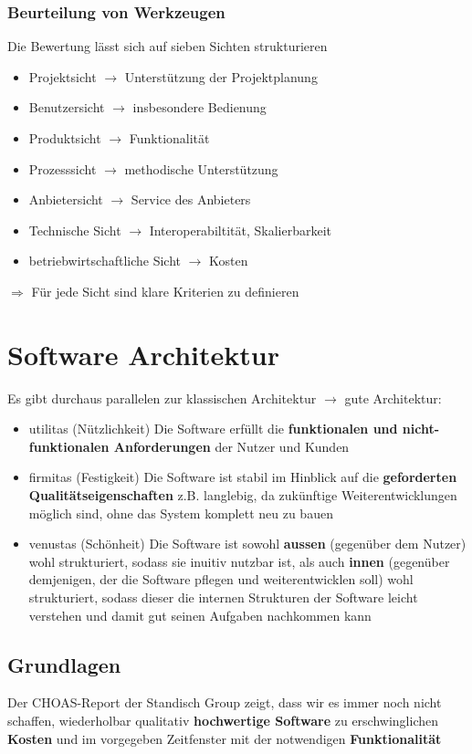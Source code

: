 \documentclass{report}
\theoremstyle{definition}
\theoremstyle{example}
\begin{document}
\subsection{Beurteilung von Werkzeugen}
Die Bewertung lässt sich auf sieben Sichten strukturieren
\begin{itemize}
   \item Projektsicht $\rightarrow$ Unterstützung der Projektplanung
   \item Benutzersicht $\rightarrow$ insbesondere Bedienung
   \item Produktsicht $\rightarrow$ Funktionalität
   \item Prozesssicht $\rightarrow$ methodische Unterstützung
   \item Anbietersicht $\rightarrow$ Service des Anbieters
   \item Technische Sicht $\rightarrow$ Interoperabiltität, Skalierbarkeit
   \item betriebwirtschaftliche Sicht $\rightarrow$ Kosten
\end{itemize}
$\Rightarrow$ Für jede Sicht sind klare Kriterien zu definieren



\chapter{Software Architektur}
Es gibt durchaus parallelen zur klassischen Architektur $\rightarrow$ gute Architektur:\\
\begin{itemize}
   \item utilitas (Nützlichkeit)
   \subitem Die Software erfüllt die \textbf{funktionalen und nicht-funktionalen Anforderungen} der Nutzer und Kunden  
   \item firmitas (Festigkeit)
   \subitem Die Software ist stabil im Hinblick auf die \textbf{geforderten Qualitätseigenschaften} z.B. langlebig, da zukünftige Weiterentwicklungen möglich sind, ohne das System komplett neu zu bauen 
   \item venustas (Schönheit)
   \subitem Die Software ist sowohl \textbf{aussen} (gegenüber dem Nutzer) wohl strukturiert, sodass sie inuitiv nutzbar ist, als auch \textbf{innen} (gegenüber demjenigen, der die Software pflegen und weiterentwicklen soll) wohl strukturiert, sodass dieser die internen Strukturen der Software leicht verstehen und damit gut seinen Aufgaben nachkommen kann
\end{itemize}


\section{Grundlagen}
Der CHOAS-Report der Standisch Group zeigt, dass wir es immer noch nicht schaffen, wiederholbar qualitativ \textbf{hochwertige Software} zu erschwinglichen \textbf{Kosten} und im vorgegeben Zeitfenster mit der notwendigen \textbf{Funktionalität}
\end{document}
